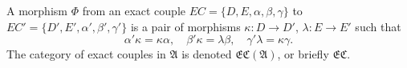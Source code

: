 A morphism $\Phi$ from an exact couple $\mathit{EC} = \{D, E, \alpha, \beta, \gamma\}$ to $\mathit{EC}' = \{D', E', \alpha', \beta', \gamma'\}$ is a pair of morphisms $\kappa : D \to D'$, $\lambda : E \to E'$ such that
$$\alpha' \kappa = \kappa \alpha, \quad \beta' \kappa = \lambda \beta, \quad \gamma' \lambda = \kappa \gamma.$$
The category of exact couples in $\mathfrak{A}$ is denoted $\mathfrak{EC}(\mathfrak{A})$, or briefly $\mathfrak{EC}$.

